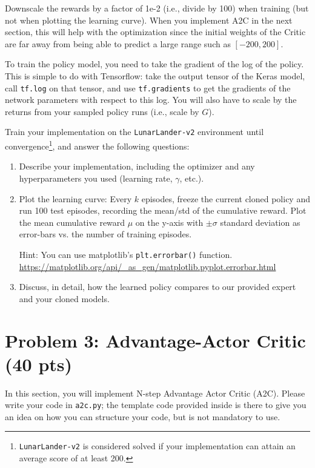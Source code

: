 \documentclass[12pt]{article}
\begin{document}
Downscale the rewards by a factor of 1e-2 (i.e., divide by 100) when training (but not when plotting the learning curve). When you implement A2C in the next section, this will help with the optimization since the initial weights of the Critic are far away from being able to predict a large range such as $[-200, 200]$.

To train the policy model, you need to take the gradient of the log of the policy. This is simple to do with Tensorflow: take the output tensor of the Keras model, call \texttt{tf.log} on that tensor, and use \texttt{tf.gradients} to get the gradients of the network parameters with respect to this log. You will also have to scale by the returns from your sampled policy runs (i.e., scale by $G$).

Train your implementation on the \texttt{LunarLander-v2} environment until convergence\footnote{\texttt{LunarLander-v2} is considered solved if your implementation can attain an average score of at least 200.}, and answer the following questions:

\begin{enumerate}
\item Describe your implementation, including the optimizer and any hyperparameters you used (learning rate, $\gamma$, etc.).

\item  Plot the learning curve: Every $k$ episodes, freeze the current cloned policy and run 100 test episodes, recording the mean/std of the cumulative reward. Plot the mean cumulative reward $\mu$ on the y-axis with $\pm \sigma$ standard deviation as error-bars vs. the number of training episodes.

Hint: You can use matplotlib's \texttt{plt.errorbar()} function. \url{https://matplotlib.org/api/\_as\_gen/matplotlib.pyplot.errorbar.html}

\item Discuss, in detail, how the learned policy compares to our provided expert and your cloned models.
\end{enumerate}

\section*{Problem 3: Advantage-Actor Critic (40 pts)}

In this section, you will implement N-step Advantage Actor Critic (A2C). Please write your code in \texttt{a2c.py}; the template code provided inside is there to give you an idea on how you can structure your code, but is not mandatory to use.
\end{document}
